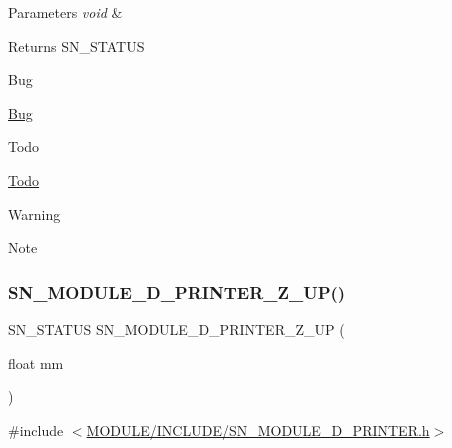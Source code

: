 \begin{DoxyParams}{Parameters}
{\em void} & \\
\hline
\end{DoxyParams}
\begin{DoxyReturn}{Returns}
S\+N\+\_\+\+S\+T\+A\+T\+US 
\end{DoxyReturn}
\begin{DoxyRefDesc}{Bug}
\item[\hyperlink{bug__bug000009}{Bug}]\end{DoxyRefDesc}
\begin{DoxyRefDesc}{Todo}
\item[\hyperlink{todo__todo000009}{Todo}]\end{DoxyRefDesc}
\begin{DoxyWarning}{Warning}

\end{DoxyWarning}
\begin{DoxyNote}{Note}

\end{DoxyNote}
\mbox{\label{group__PRINTER_ga4671a91d49ef53f67f1d203f18355c63}} 
\subsubsection{\texorpdfstring{S\+N\+\_\+\+M\+O\+D\+U\+L\+E\+\_\+D\+\_\+\+P\+R\+I\+N\+T\+E\+R\+\_\+\+Z\+\_\+\+U\+P()}{SN\_MODULE\_3D\_PRINTER\_Z\_UP()}}
{\footnotesize\ttfamily S\+N\+\_\+\+S\+T\+A\+T\+US S\+N\+\_\+\+M\+O\+D\+U\+L\+E\+\_\+D\+\_\+\+P\+R\+I\+N\+T\+E\+R\+\_\+\+Z\+\_\+\+UP (\begin{DoxyParamCaption}\item[{float}]{mm }\end{DoxyParamCaption})}



{\ttfamily \#include $<$\hyperlink{SN__MODULE__3D__PRINTER_8h}{M\+O\+D\+U\+L\+E/\+I\+N\+C\+L\+U\+D\+E/\+S\+N\+\_\+\+M\+O\+D\+U\+L\+E\+\_\+D\+\_\+\+P\+R\+I\+N\+T\+E\+R.\+h}$>$}


